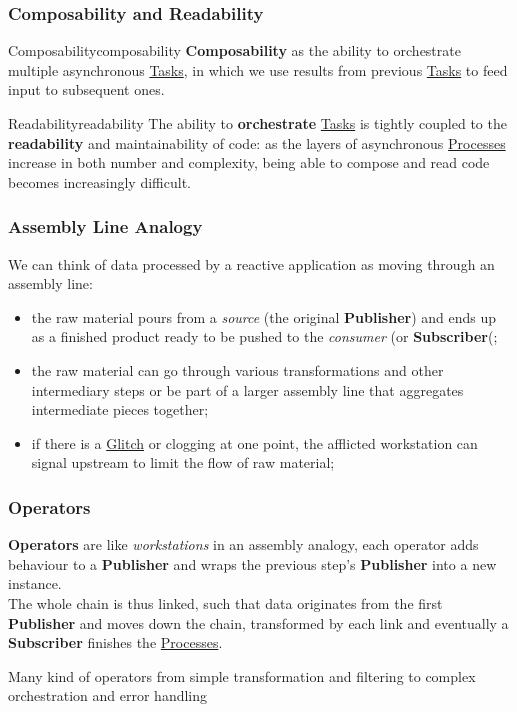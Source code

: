 \subsubsection{Composability and Readability}\label{sub:rp_composability_and_readability} %
\begin{definition}{Composability}{composability}
    \textbf{Composability} as the ability to orchestrate multiple asynchronous \hyperref[def:task]{Tasks}, in which we use results from previous \hyperref[def:task]{Tasks} to feed input to subsequent ones.
\end{definition}
\begin{definition}{Readability}{readability}
    The ability to \textbf{orchestrate} \hyperref[def:task]{Tasks} is tightly coupled to the \textbf{readability} and maintainability of code: as the layers of asynchronous \hyperref[def:process]{Processes} increase in both number and complexity, being able to compose and read code becomes increasingly difficult.
\end{definition}
%
\subsubsection{Assembly Line Analogy}\label{sub:rp_assembly_line_analogy} %
We can think of data processed by a reactive application as moving through an assembly line:
\begin{itemize}
    \item the raw material pours from a \textit{source} (the original \textbf{Publisher}) and ends up as a finished product ready to be pushed to the \textit{consumer} (or \textbf{Subscriber}(;
    \item the raw material can go through various transformations and other intermediary steps or be part of a larger assembly line that aggregates intermediate pieces together;
    \item if there is a \hyperref[sub:rp_glitches]{Glitch} or clogging at one point, the afflicted workstation can signal upstream to limit the flow of raw material;
\end{itemize}
%
\subsubsection{Operators}\label{sub:rp_operators} %
\textbf{Operators} are like \textit{workstations} in an assembly analogy, each operator adds behaviour to a \textbf{Publisher} and wraps the previous step's \textbf{Publisher} into a new instance.
\\
The whole chain is thus linked, such that data originates from the first \textbf{Publisher} and moves down the chain, transformed by each link and eventually a \textbf{Subscriber} finishes the \hyperref[def:process]{Processes}.
\begin{note}
    Many kind of operators from simple transformation and filtering to complex orchestration and error handling
\end{note}
%
